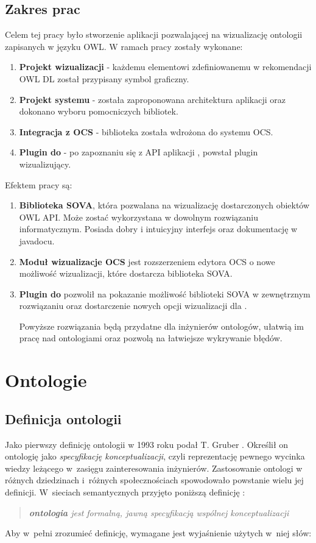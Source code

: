 \subsection{Zakres prac}
Celem tej pracy było stworzenie aplikacji pozwalającej na wizualizację ontologii zapisanych w języku OWL. W ramach pracy zostały wykonane:
\begin{enumerate}
 \item {\bf Projekt wizualizacji} - każdemu elementowi  zdefiniowanemu  w rekomendacji OWL DL został przypisany symbol graficzny. 
 \item {\bf Projekt systemu} - została zaproponowana architektura aplikacji oraz dokonano wyboru pomocniczych bibliotek.
 \item {\bf Integracja z OCS} - biblioteka została wdrożona do systemu OCS.
 \item {\bf Plugin do \protege} - po zapoznaniu się z API aplikacji \protege, powstał plugin wizualizujący. 
\end{enumerate}
 Efektem pracy są:
\begin{enumerate}
 \item {\bf Biblioteka SOVA}, która pozwalana na wizualizację dostarczonych obiektów OWL API. Może zostać wykorzystana w dowolnym rozwiązaniu informatycznym. Posiada 
dobry i intuicyjny interfejs oraz dokumentację w javadocu.
 \item {\bf Moduł wizualizacje OCS} jest rozszerzeniem edytora OCS o nowe możliwość wizualizacji, które dostarcza biblioteka SOVA. 
 \item {\bf Plugin do \protege} pozwolił na pokazanie możliwość biblioteki SOVA w zewnętrznym rozwiązaniu oraz dostarczenie nowych opcji wizualizacji dla \protege.

Powyższe rozwiązania będą przydatne dla inżynierów ontologów, ułatwią im pracę nad ontologiami oraz pozwolą na łatwiejsze wykrywanie błędów.  
\end{enumerate}
\section{Ontologie}
\subsection*{Definicja ontologii}
Jako pierwszy definicję ontologii w 1993 roku podał T. Gruber \cite{gruber}. Określił on ontologię jako {\it specyfikację konceptualizacji}, czyli reprezentację pewnego wycinka wiedzy leżącego 
w~zasięgu zainteresowania inżynierów. Zastosowanie ontologi w różnych dziedzinach i~różnych społecznościach spowodowało powstanie wielu jej definicji. W~sieciach 
semantycznych przyjęto poniższą definicję \cite{knowledge}: 
\begin{quote}
\textit{{\bf ontologia} jest formalną, jawną specyfikacją wspólnej konceptualizacji}
\end{quote}
Aby w~pełni zrozumieć definicję, wymagane jest wyjaśnienie użytych w~niej słów:

